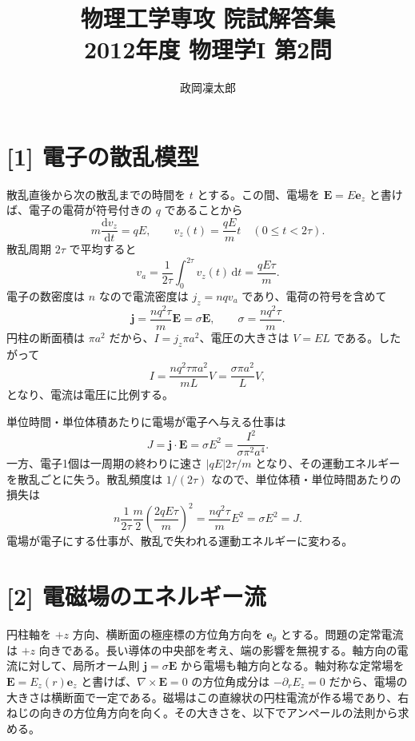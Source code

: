 \documentclass[11pt,a4paper]{article}
\title{物理工学専攻 院試解答集\\2012年度 物理学I 第2問}
\author{政岡凜太郎}
\date{}
\begin{document}
\maketitle

\section*{[1] 電子の散乱模型}
散乱直後から次の散乱までの時間を $t$ とする。この間、電場を $\boldsymbol{E}=E\boldsymbol{e}_z$ と書けば、電子の電荷が符号付きの $q$ であることから
\begin{equation}
  m\frac{\mathrm{d}v_z}{\mathrm{d}t}=qE,\qquad
  v_z(t)=\frac{qE}{m}t\quad(0\le t<2\tau).
\end{equation}
散乱周期 $2\tau$ で平均すると
\begin{equation}
  \boxed{v_a=\frac{1}{2\tau}\int_0^{2\tau}v_z(t)\,\mathrm{d}t
  =\frac{qE\tau}{m}.}
\end{equation}
電子の数密度は $n$ なので電流密度は $j_z=nqv_a$ であり、電荷の符号を含めて
\begin{equation}
  \boldsymbol{j}=\frac{nq^2\tau}{m}\boldsymbol{E}=\sigma\boldsymbol{E},
  \qquad \boxed{\sigma=\frac{nq^2\tau}{m}}.
\end{equation}
円柱の断面積は $\pi a^2$ だから、$I=j_z\pi a^2$、電圧の大きさは $V=EL$ である。したがって
\begin{equation}
  I=\frac{nq^2\tau\pi a^2}{mL}V=\frac{\sigma\pi a^2}{L}V,
\end{equation}
となり、電流は電圧に比例する。

単位時間・単位体積あたりに電場が電子へ与える仕事は
\begin{equation}
  J=\boldsymbol{j}\cdot\boldsymbol{E}=\sigma E^2
  =\boxed{\frac{I^2}{\sigma\pi^2a^4}}.
\end{equation}
一方、電子1個は一周期の終わりに速さ $|qE|2\tau/m$ となり、その運動エネルギーを散乱ごとに失う。散乱頻度は $1/(2\tau)$ なので、単位体積・単位時間あたりの損失は
\begin{equation}
  n\frac{1}{2\tau}\frac{m}{2}\left(\frac{2qE\tau}{m}\right)^2
  =\frac{nq^2\tau}{m}E^2=\sigma E^2=J.
\end{equation}
電場が電子にする仕事が、散乱で失われる運動エネルギーに変わる。

\section*{[2] 電磁場のエネルギー流}
円柱軸を $+z$ 方向、横断面の極座標の方位角方向を $\boldsymbol{e}_\theta$ とする。問題の定常電流は $+z$ 向きである。長い導体の中央部を考え、端の影響を無視する。軸方向の電流に対して、局所オーム則 $\boldsymbol{j}=\sigma\boldsymbol{E}$ から電場も軸方向となる。軸対称な定常場を $\boldsymbol{E}=E_z(r)\boldsymbol{e}_z$ と書けば、$\nabla\times\boldsymbol{E}=0$ の方位角成分は $-\partial_rE_z=0$ だから、電場の大きさは横断面で一定である。磁場はこの直線状の円柱電流が作る場であり、右ねじの向きの方位角方向を向く。その大きさを、以下でアンペールの法則から求める。
\end{document}
